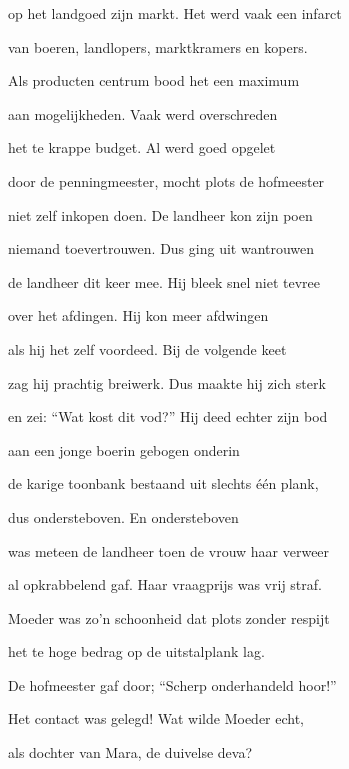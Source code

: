 op het landgoed zijn markt.
Het werd vaak een infarct

van boeren, landlopers,
marktkramers en kopers.

Als producten centrum
bood het een maximum

aan mogelijkheden.
Vaak werd overschreden

het te krappe budget.
Al werd goed opgelet

door de penningmeester,
mocht plots de hofmeester

niet zelf inkopen doen.
De landheer kon zijn poen

niemand toevertrouwen.
Dus ging uit wantrouwen

de landheer dit keer mee.
Hij bleek snel niet tevree

over het afdingen.
Hij kon meer afdwingen

als hij het zelf voordeed.
Bij de volgende keet

zag hij prachtig breiwerk.
Dus maakte hij zich sterk

en zei: “Wat kost dit vod?”
Hij deed echter zijn bod

aan een jonge boerin
gebogen onderin

de karige toonbank
bestaand uit slechts één plank,

dus ondersteboven.
En ondersteboven

was meteen de landheer
toen de vrouw haar verweer

al opkrabbelend gaf.
Haar vraagprijs was vrij straf.

Moeder was zo’n schoonheid
dat plots zonder respijt

het te hoge bedrag
op de uitstalplank lag.

De hofmeester gaf door;
“Scherp onderhandeld hoor!”

Het contact was gelegd!
Wat wilde Moeder echt,

als dochter van Mara,
de duivelse deva?
